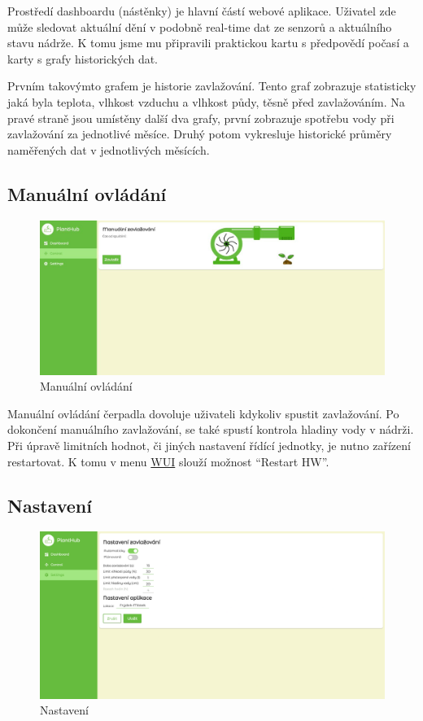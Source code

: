 \documentclass[czech,12pt,a4paper]{article}
\begin{document}
Prostředí dashboardu (nástěnky) je hlavní částí webové aplikace. Uživatel zde může sledovat aktuální dění v podobně real-time dat ze senzorů a aktuálního stavu nádrže. K tomu jsme mu připravili praktickou kartu s předpovědí počasí a karty s grafy historických dat.

Prvním takovýmto grafem je historie zavlažování. Tento graf zobrazuje statisticky jaká byla teplota, vlhkost vzduchu a vlhkost půdy, těsně před zavlažováním. Na pravé straně jsou umístěny další dva grafy, první zobrazuje spotřebu vody při zavlažování za jednotlivé měsíce. Druhý potom vykresluje historické průměry naměřených dat v jednotlivých měsících.

\clearpage

\subsection{Manuální ovládání}

\begin{figure}[h]
	\centering
	\includegraphics[width=\linewidth]{web-ui-pump.png}
	\caption{Manuální ovládání}
\end{figure}

Manuální ovládání čerpadla dovoluje uživateli kdykoliv spustit zavlažování. Po dokončení manuálního zavlažování, se také spustí kontrola hladiny vody v nádrži. Při úpravě limitních hodnot, či jiných nastavení řídící jednotky, je nutno zařízení restartovat. K tomu v menu \underline{\ac{WUI}} slouží možnost \enquote{Restart HW}.

\clearpage

\subsection{Nastavení}

\begin{figure}[h]
	\centering
	\includegraphics[width=\linewidth]{web-ui-settings.png}
	\caption{Nastavení}
\end{figure}
\end{document}

